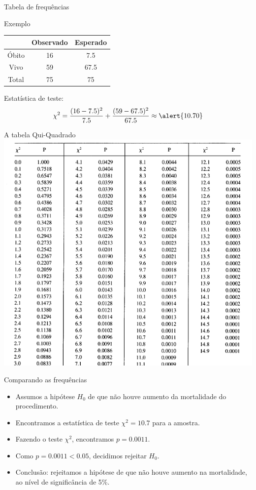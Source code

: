 \documentclass{beamer}
\begin{document}
\begin{frame}{Tabela de frequências}
  \begin{exampleblock}{Exemplo}
    \begin{tabular}{c|c|c}
      & Observado & Esperado\\
      \hline
      Óbito & 16 & 7.5 \\
      \hline
      Vivo & 59 & 67.5 \\
      \hline
      Total & 75 & 75\\
    \end{tabular}
  \end{exampleblock}

Estatística de teste:
  \begin{displaymath}
    \chi^2 = \frac{(16 - 7.5)^2}{7.5} + \frac{(59 - 67.5)^2}{67.5} \approx \alert{10.70}
  \end{displaymath}
\end{frame}

\begin{frame}{A tabela Qui-Quadrado}
\includegraphics[height=\textheight]{Cap26-27/qui-quadrado1}
\end{frame}

\begin{frame}{Comparando as frequências}
  \begin{itemize}
  \item Assumos a hipótese $H_0$ de que não houve aumento da
    mortalidade do procedimento.
  \item Encontramos a estatística de teste $\chi^2 = 10.7$ para a
    amostra.
  \item Fazendo o teste $\chi^2$, encontramos $p=0.0011$.
  \item Como $p=0.0011 < 0.05$, decidimos \alert{rejeitar} $H_0$.
  \item Conclusão: rejeitamos a hipótese de que não houve aumento na
    mortalidade, ao nível de significância de 5\%.
  \end{itemize}
\end{frame}
\end{document}

